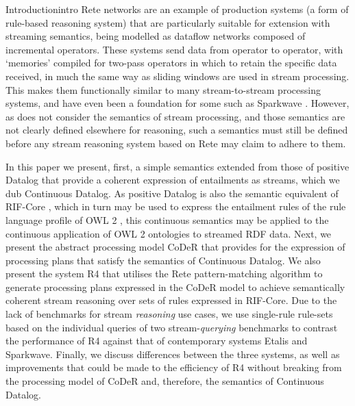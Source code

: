 \begin{nestedsection}{Introduction}{intro}
	Rete networks \citep{forgy79} are an example of production systems (a form of rule-based reasoning system) that are particularly suitable for extension with streaming semantics, being modelled as dataflow networks composed of incremental operators.
	These systems send data from operator to operator, with `memories' compiled for two-pass operators in which to retain the specific data received, in much the same way as sliding windows are used in stream processing.
	This makes them functionally similar to many stream-to-stream processing systems, and have even been a foundation for some such as Sparkwave \citep{sparkwave}.
	However, as \citep{forgy79} does not consider the semantics of stream processing, and those semantics are not clearly defined elsewhere for reasoning, such a semantics must still be defined before any stream reasoning system based on Rete may claim to adhere to them.

	In this paper we present, first, a simple semantics extended from those of positive Datalog that provide a coherent expression of entailments as streams, which we dub Continuous Datalog.
	As positive Datalog is also the semantic equivalent of RIF-Core \citep{w3crifcore}, which in turn may be used to express the entailment rules of the rule language profile of OWL 2 \citep{w3cowl2profiles}, this continuous semantics may be applied to the continuous application of OWL 2 ontologies to streamed RDF data.
	Next, we present the abstract processing model CoDeR that provides for the expression of processing plans that satisfy the semantics of Continuous Datalog.
	We also present the system R4 that utilises the Rete pattern-matching algorithm to generate processing plans expressed in the CoDeR model to achieve semantically coherent stream reasoning over sets of rules expressed in RIF-Core.
	Due to the lack of benchmarks for stream \emph{reasoning} use cases, we use single-rule rule-sets based on the individual queries of two stream-\emph{querying} benchmarks to contrast the performance of R4 against that of contemporary systems Etalis and Sparkwave.
	Finally, we discuss differences between the three systems, as well as improvements that could be made to the efficiency of R4 without breaking from the processing model of CoDeR and, therefore, the semantics of Continuous Datalog.
\end{nestedsection}
